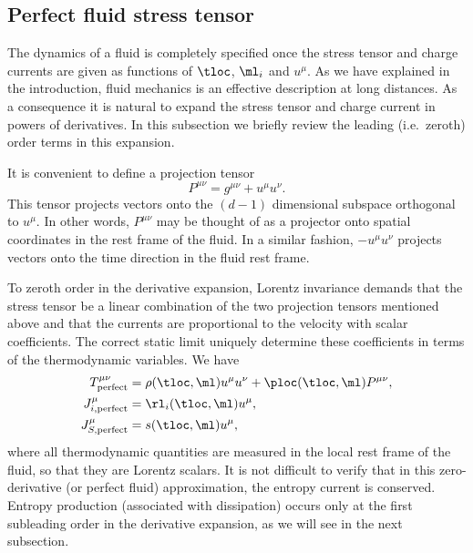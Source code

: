 \subsection{Perfect fluid stress tensor}\label{sec:perfstr}

The dynamics of a fluid is completely specified once the stress tensor and charge currents are given as functions of $\tloc$, $\ml_i$ and $u^\mu$. As we have explained in the introduction, fluid mechanics is an effective description at long distances. As a consequence it is natural to expand the stress tensor and charge current in powers of derivatives. In this subsection we briefly review the leading (i.e.\ zeroth) order terms in this expansion.

It is convenient to define a projection tensor
%
\begin{equation}\label{proj:eq}
  P^{\mu\nu} = g^{\mu\nu} + u^\mu u^\nu.
\end{equation}
%
This tensor projects vectors onto the $(d-1)$ dimensional subspace orthogonal to $u^\mu$. In other words, $P^{\mu\nu}$ may be thought of as a projector onto spatial coordinates in the rest frame of the fluid. In a similar fashion, $- u^\mu u^\nu$ projects vectors onto the time direction in the fluid rest frame.

To zeroth order in the derivative expansion, Lorentz invariance demands that the stress tensor be a linear combination of the two projection tensors mentioned above and that the currents are proportional to the velocity with scalar coefficients. The correct static limit uniquely determine these coefficients in terms of the thermodynamic variables. We have
%
\begin{equation}\label{currents:eq}
\begin{split}
  T^{\mu\nu}_\text{perfect}& = \rho(\tloc,\ml) u^\mu u^\nu
                               + \ploc(\tloc,\ml) P^{\mu\nu}, \\
  J^\mu_{i,\text{perfect}}&=\rl_i(\tloc,\ml)u^\mu, \\
  J^\mu_{S,\text{perfect}}&=s(\tloc,\ml) u^\mu,
\end{split}
\end{equation}
%
where all thermodynamic quantities are measured in the local rest frame of the fluid, so that they are Lorentz scalars. It is not difficult to verify that in this zero-derivative (or perfect fluid) approximation, the entropy current is conserved. Entropy production (associated with dissipation) occurs only at the first subleading order in the derivative expansion, as we will see in the next subsection.

